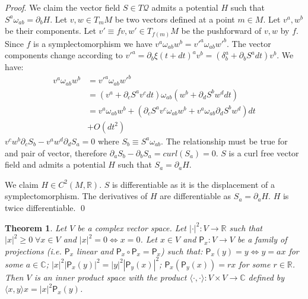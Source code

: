 \documentclass[smallextended]{svjour3}
\numberwithin{equation}{section}
\renewenvironment{proof}{\emph{Proof}.}{\hfill\(\qed\)}
\newtheorem{thrm}[equation]{Theorem}
\theoremstyle{definition}
\renewenvironment{proof}{\emph{Proof}.}{\qed}
\begin{document}
\begin{proof}
	We claim the vector field $S \in T\mathcal{Q}$ admits a potential $H$ such that $S^{a} \omega_{ab} = \partial_{b}H$. Let $v, w \in T_m M$ be two vectors defined at a point $m \in M$. Let $v^a, w^b$ be their components. Let $v'\equiv f v, w' \in T_{f(m)}M$ be the pushforward of $v, w$ by $f$. Since $f$ is a symplectomorphism we have $v^{a} \omega_{ab} w^{b} = v'^{a} \omega_{ab} w'^{b}$. The vector components change according to $v'^a = \partial_b \xi(t+dt)^a v^b = (\delta^a_b + \partial_b S^a dt) v^b$. We have:
	\begin{align*}
	v^{a} \omega_{ab} w^{b} &= v'^{a} \omega_{ab} w'^{b}  \\
	&= (v^{a} + \partial_{c} S^{a} v^{c} dt) \omega_{ab} ( w^{b} + \partial_{d} S^{b} w^{d} dt) \\
	&= v^{a} \omega_{ab} w^{b} + (\partial_{c} S^{a} v^{c} \omega_{ab} w^{b} + v^{a} \omega_{ab} \partial_{d} S^{b} w^{d}) dt \\ &+ O(dt^2)
	\end{align*}
	$v^{c} w^{b} \partial_{c} S_{b} - v^{a} w^{d} \partial_{d} S_{a} = 0$ where $S_{b} \equiv S^{a} \omega_{ab}$. The relationship must be true for and pair of vector, therefore $\partial_{a} S_{b} - \partial_{b} S_{a} = curl(S_{a}) = 0$. $S$ is a curl free vector field and admits a potential $H$ such that $S_{a} = \partial_{a}H$.
	
	We claim $H \in C^2(M, \mathbb{R})$. $S$ is differentiable as it is the displacement of a symplectomorphism. The derivatives of $H$ are differentiable as $S_{a} = \partial_{a}H$. $H$ is twice differentiable.
\end{proof}

\begin{thrm}\label{thrm:inner_product}
	Let $V$ be a complex vector space. Let $| \cdot | ^2 : V \rightarrow \mathbb{R}$ such that $|x|^2 \ge 0 \; \forall x \in V$ and $|x|^2 = 0 \Leftrightarrow x = 0$. Let $x \in V$ and $\mathsf{P}_x : V \rightarrow V$ be a family of projections (i.e. $\mathsf{P}_x$ linear and $\mathsf{P}_x \circ \mathsf{P}_x = \mathsf{P}_x$) such that: $\mathsf{P}_x (y) = y \Leftrightarrow y = a x$ for some $a \in \mathbb{C}$; $|x|^2|\mathsf{P}_x (y)|^2=|y|^2|\mathsf{P}_y (x)|^2$; $\mathsf{P}_x (\mathsf{P}_y (x)) = r x$ for some $r \in \mathbb{R}$.
	Then $V$ is an inner product space with the product $\langle \cdot , \cdot \rangle : V \times V \rightarrow \mathbb{C}$ defined by $\langle x , y \rangle x = |x|^2 \mathsf{P}_x (y)$.
\end{thrm}
\end{document}
